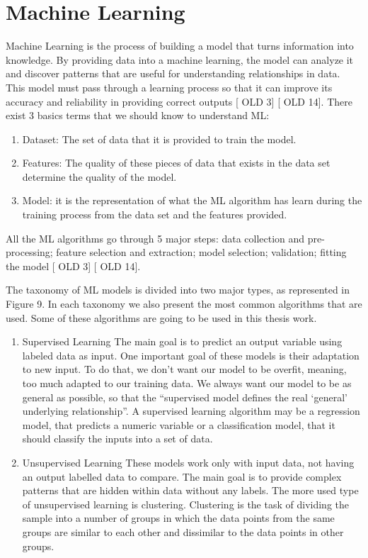 \section{Machine Learning} 
\label{sub:if_you_use_this_template} 

Machine Learning is the process of building a model that turns information into knowledge. By providing data into a machine learning, the model can analyze it and discover patterns that are useful for understanding relationships in data. This model must pass through a learning process so that it can improve its accuracy and reliability in providing correct outputs [ OLD 3] [ OLD 14].
There exist 3 basics terms that we should know to understand ML:

\begin{enumerate}
    \item 
Dataset: The set of data that it is provided to train the model.
    \item
Features: The quality of these pieces of data that exists in the data set determine the quality of the model.
    \item
Model: it is the representation of what the ML algorithm has learn during the training process from the data set and the features provided.
\end{enumerate}

All the ML algorithms go through 5 major steps: data collection and pre-processing; feature selection and extraction; model selection; validation; fitting the model [ OLD 3] [ OLD 14].


The taxonomy of ML models is divided into two major types, as represented in Figure 9. In each taxonomy we also present the most common algorithms that are used. Some of these algorithms are going to be used in this thesis work.

\begin{enumerate}
    \item{Supervised Learning}
The main goal is to predict an output variable using labeled data as input. One important goal of these models is their adaptation to new input. To do that, we don’t want our model to be overfit, meaning, too much adapted to our training data. We always want our model to be as general as possible, so that the “supervised model defines the real ‘general’ underlying relationship”. A supervised learning algorithm may be a regression model, that predicts a numeric variable or a classification model, that it should classify the inputs into a set of data.

    \item{Unsupervised Learning}
These models work only with input data, not having an output labelled data to compare. The main goal is to provide complex patterns that are hidden within data without any labels. The more used type of unsupervised learning is clustering. Clustering is the task of dividing the sample into a number of groups in which the data points from the same groups are similar to each other and dissimilar to the data points in other groups.
\end{enumerate}

